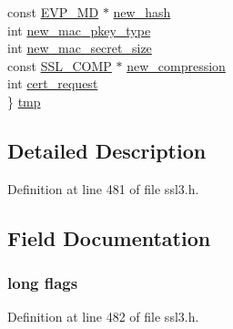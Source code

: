 \begin{DoxyCompactItemize}
\begin{tabbing}
\>const \hyperlink{crypto_2ossl__typ_8h_aac66cf010326fa9a927c2a34888f45d3}{EVP\_MD} $\ast$ \hyperlink{structssl3__state__st_a0ebd015a987d489ed611a1d24d275724}{new\_hash}\\
\>int \hyperlink{structssl3__state__st_ab5bb160de14310f14b89685bf7a4659a}{new\_mac\_pkey\_type}\\
\>int \hyperlink{structssl3__state__st_ad82dcd0686b8aba6c6293cc086e99d06}{new\_mac\_secret\_size}\\
\>const \hyperlink{include_2openssl_2ssl_8h_a4cd5a344b1a968bf05804c52899f21fe}{SSL\_COMP} $\ast$ \hyperlink{structssl3__state__st_ad4e3a32e2b1e55dcd310c7bc0e07ec57}{new\_compression}\\
\>int \hyperlink{structssl3__state__st_aea687a2eb34603cfdf4c9f15f60d9a72}{cert\_request}\\
\} \hyperlink{structssl3__state__st_ae70560dcf4b9288f112e86ddc015e425}{tmp}\\

\end{tabbing}\end{DoxyCompactItemize}


\subsection{Detailed Description}


Definition at line 481 of file ssl3.\+h.



\subsection{Field Documentation}
\subsubsection[{\texorpdfstring{flags}{flags}}]{\setlength{\rightskip}{0pt plus 5cm}long flags}\hypertarget{structssl3__state__st_a6a36e81b5744ff152979cae202d37e78}{}\label{structssl3__state__st_a6a36e81b5744ff152979cae202d37e78}


Definition at line 482 of file ssl3.\+h.

